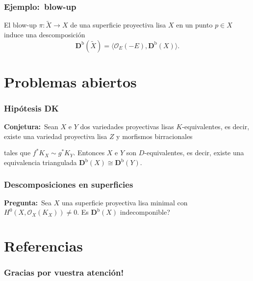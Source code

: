 \documentclass[12pt]{beamer}
\begin{document}
\begin{frame}
  \frametitle{Ejemplo:~blow-up}
  El blow-up $\pi \colon \tilde{X} \to X$ de una superficie proyectiva lisa $X$ en un punto $p \in X$ induce una descomposición
  \[ \mathbf{D}^{\mathrm{b}}(\tilde{X}) = \langle \mathscr{O}_{E}(-E), \mathbf{D}^{\mathrm{b}}(X) \rangle. \]
\end{frame}

\section{Problemas abiertos}

\begin{frame}
  \frametitle{Hipótesis DK}
  \textbf{Conjetura:}~Sean $X$ e $Y$ dos variedades proyectivas lisas $K$-equivalentes, es decir, existe una variedad proyectiva lisa $Z$ y morfismos birracionales
  \begin{center}
  \end{center}
  tales que $f^{*}K_{X} \sim g^{*}K_{Y}$.
  \pause
  Entonces $X$ e $Y$ son $D$-equivalentes, es decir, existe una equivalencia triangulada $\mathbf{D}^{\mathrm{b}}(X) \cong \mathbf{D}^{\mathrm{b}}(Y)$.
\end{frame}

\begin{frame}
  \frametitle{Descomposiciones en superficies}
  \textbf{Pregunta:}~Sea $X$ una superficie proyectiva lisa minimal con $H^{0}(X,\mathscr{O}_{X}(K_{X})) \neq 0$.
  Es $\mathbf{D}^{\mathrm{b}}(X)$ indecomponible?
\end{frame}

\section{Referencias}

\begin{frame}
  \frametitle{Gracias por vuestra atención!}
  \nocite{gm03}
  \nocite{huy06}
  \nocite{kaw17}
  \nocite{mat02}
  \printbibliography[heading=none]
\end{frame}
\end{document}
